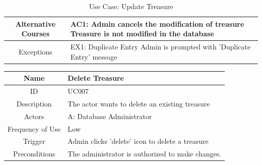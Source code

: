 \documentclass[12pt, a4paper, oneside]{article}
\begin{document}
\begin{table}[H]
\begin{tabularx}{\linewidth}{|c|X|}
Alternative Courses & AC1: Admin cancels the modification of treasure \newline Treasure is not modified in the database                                                                                             \\ \hline
Exceptions          & EX1: Duplicate Entry \newline Admin is prompted with 'Duplicate Entry' message \\ \hline
\end{tabularx}
\caption{Use Case: Update Treasure}
\label{uc-update-treasure}
\end{table}

\begin{table}[H]
\begin{tabularx}{\linewidth}{|c|X|}
\hline
Name                & Delete Treasure                                                                                                                                                                                                                      \\ \hline
ID                  & UC007                                                                                                                                                                                                                       \\ \hline
Description         & The actor wants to delete an existing treasure                                                                                                                                                    \\ \hline
Actors              & A: Database Administrator                                                                                                                                                                                                 \\ \hline
Frequency of Use    & Low                                                                                                                                                                                                                    \\ \hline
Trigger             & Admin clicks 'delete' icon to delete a treasure                                                                                                                                                                                           \\ \hline
Preconditions       & The administrator is authorized to make changes.                                                                                                                                                                                     \\ \hline

\end{tabularx}
\end{table}
\end{document}
